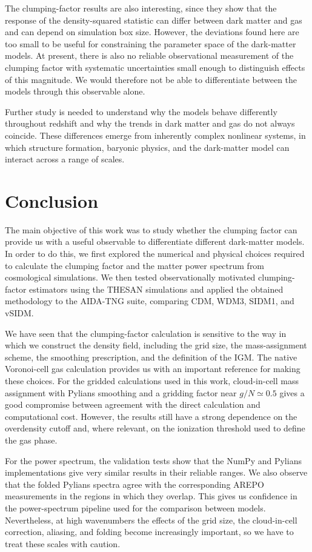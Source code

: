 \documentclass[%
 reprint,
nofootinbib,
 amsmath,amssymb,
 aps,
]{revtex4-2}
\begin{document}
The clumping-factor results are also interesting, since they show that the response of the density-squared statistic can differ between dark matter and gas and can depend on simulation box size. However, the deviations found here are too small to be useful for constraining the parameter space of the dark-matter models. At present, there is also no reliable observational measurement of the clumping factor with systematic uncertainties small enough to distinguish effects of this magnitude. We would therefore not be able to differentiate between the models through this observable alone.

Further study is needed to understand why the models behave differently throughout redshift and why the trends in dark matter and gas do not always coincide. These differences emerge from inherently complex nonlinear systems, in which structure formation, baryonic physics, and the dark-matter model can interact across a range of scales.

\section{Conclusion}

The main objective of this work was to study whether the clumping factor can provide us with a useful observable to differentiate different dark-matter models. In order to do this, we first explored the numerical and physical choices required to calculate the clumping factor and the matter power spectrum from cosmological simulations. We then tested observationally motivated clumping-factor estimators using the THESAN simulations and applied the obtained methodology to the AIDA-TNG suite, comparing CDM, WDM3, SIDM1, and vSIDM.

We have seen that the clumping-factor calculation is sensitive to the way in which we construct the density field, including the grid size, the mass-assignment scheme, the smoothing prescription, and the definition of the IGM. The native Voronoi-cell gas calculation provides us with an important reference for making these choices. For the gridded calculations used in this work, cloud-in-cell mass assignment with Pylians smoothing and a gridding factor near $g/N\simeq0.5$ gives a good compromise between agreement with the direct calculation and computational cost. However, the results still have a strong dependence on the overdensity cutoff and, where relevant, on the ionization threshold used to define the gas phase.

For the power spectrum, the validation tests show that the NumPy and Pylians implementations give very similar results in their reliable ranges. We also observe that the folded Pylians spectra agree with the corresponding AREPO measurements in the regions in which they overlap. This gives us confidence in the power-spectrum pipeline used for the comparison between models. Nevertheless, at high wavenumbers the effects of the grid size, the cloud-in-cell correction, aliasing, and folding become increasingly important, so we have to treat these scales with caution.
\end{document}

